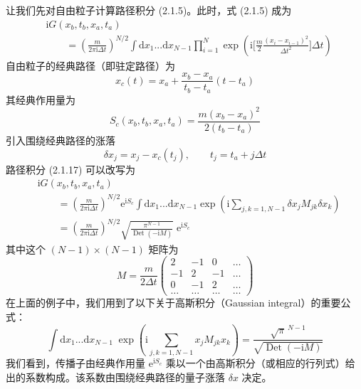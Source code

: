 让我们先对自由粒子计算路径积分 (2.1.5)。此时，式 (2.1.5) 成为
\begin{align*}
&\mathrm{i}G(x_b,t_b,x_a,t_a)\\
&\qquad = \left(\frac{m}{2\pi\mathrm{i}\Delta t}\right)^{N/2} \int \mathrm{d}x_1...\mathrm{d}x_{N-1} \prod_{i=1}^{N} \exp\left(\mathrm{i}\big[\frac{m}{2}\frac{(x_i-x_{i-1})^2}{\Delta t^2}\big]\Delta t\right) \tag{2.1.17}
\end{align*}
自由粒子的经典路径（即驻定路径）为
\begin{equation*}
x_c(t) = x_a + \frac{x_b-x_a}{t_b-t_a}(t-t_a)
\end{equation*}
其经典作用量为
\begin{equation*}
S_c(x_b,t_b,x_a,t_a) = \frac{m(x_b-x_a)^2}{2(t_b-t_a)}
\end{equation*}
引入围绕经典路径的涨落
\begin{equation*}
\delta x_j = x_j - x_c(t_j), \qquad t_j = t_a + j\Delta t
\end{equation*}
路径积分 (2.1.17) 可以改写为
\begin{align*}
&\mathrm{i}G(x_b,t_b,x_a,t_a)\\
&\qquad = \left(\frac{m}{2\pi\mathrm{i}\Delta t}\right)^{N/2} \mathrm{e}^{\mathrm{i}S_c} \int \mathrm{d}x_1...\mathrm{d}x_{N-1} \exp\left(\mathrm{i}\sum_{j,k=1,N-1} \delta x_j M_{jk}\delta x_k\right)\\
&\qquad = \left(\frac{m}{2\pi\mathrm{i}\Delta t}\right)^{N/2} \sqrt{\frac{\pi^{N-1}}{\operatorname{Det}(-\mathrm{i}M)}}\; \mathrm{e}^{\mathrm{i}S_c}
\end{align*}
其中这个 $(N-1)\times(N-1)$ 矩阵为
\begin{equation*}
M = \frac{m}{2\Delta t}\left(\begin{array}{cccc} 2 & -1 & 0 & \dots\\ -1 & 2 & -1 & \dots\\ 0 & -1 & 2 & \dots\\ \dots & \dots & \dots & \dots \end{array}\right)
\end{equation*}
在上面的例子中，我们用到了以下关于高斯积分（Gaussian integral）的重要公式：
\begin{equation*}
\int \mathrm{d}x_1...\mathrm{d}x_{N-1}\; \exp\left(\mathrm{i}\sum_{j,k=1,N-1} x_j M_{jk}x_k\right) = \frac{\sqrt{\pi}^{\,N-1}}{\sqrt{\operatorname{Det}(-\mathrm{i}M)}}
\end{equation*}
我们看到，传播子由经典作用量 $\mathrm{e}^{\mathrm{i}S_c}$ 乘以一个由高斯积分（或相应的行列式）给出的系数构成。该系数由围绕经典路径的量子涨落 $\delta x$ 决定。

